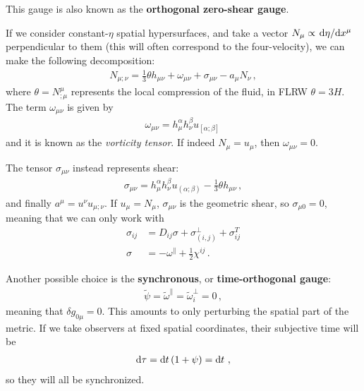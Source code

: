\documentclass[main.tex]{subfiles}
\begin{document}
This gauge is also known as the \textbf{orthogonal zero-shear gauge}.

If we consider constant-\(\eta \) spatial hypersurfaces, and take a vector \(N_\mu \propto \dv*{\eta }{x^{\mu }}\) perpendicular to them (this will often correspond to the four-velocity), we can make the following decomposition: 
%
\begin{align}
N_{\mu ; \nu } = \frac{1}{3} \theta h_{\mu \nu } + \omega_{\mu \nu } + \sigma_{\mu \nu } - a_\mu N_\nu 
\,,
\end{align}
%
where \(\theta = N^{\mu }_{;\mu }\) represents the local compression of the fluid, in FLRW \(\theta = 3 H\).
The term \(\omega_{\mu \nu }\) is given by 
%
\begin{align}
\omega_{\mu \nu } =  h^{\alpha }_{\mu } h^{\beta }_{\nu } u_{[\alpha ; \beta ]}
\,
\end{align}
%
and it is known as the \emph{vorticity tensor}. 
If indeed \(N_\mu = u_\mu \), then \(\omega_{\mu \nu } = 0\). 

The tensor \(\sigma_{\mu \nu }\) instead represents shear:
%
\begin{align}
\sigma_{\mu \nu } =   h^{\alpha }_{\mu } h^{\beta }_{\nu } u_{(\alpha ; \beta )} - \frac{1}{3} \theta h_{\mu \nu }
\,,
\end{align}
%
and finally \(a^{\mu } = u^{\nu } u_{\mu ; \nu }\).
If \(u_{\mu} = N_\mu\), \(\sigma_{\mu \nu } \) is the geometric shear, so \(\sigma_{\mu 0} = 0\), meaning that we can only work with 
%
\begin{align}
\sigma_{ij} &= D_{ij} \sigma + \sigma^{\perp}_{(i, j)} + \sigma^{T}_{ij}  \\
\sigma &= - \omega^{\parallel} + \frac{1}{2} \chi^{ij}
\,.
\end{align}


Another possible choice is the \textbf{synchronous}, or \textbf{time-orthogonal gauge}: 
%
\begin{align}
\widetilde{\psi} = \widetilde{\omega}^{\parallel} = \widetilde{\omega}^{\perp}_i = 0
\,,
\end{align}
%
meaning that \(\delta g_{0\mu } = 0 \). 
This amounts to only perturbing the spatial part of the metric.
If we take observers at fixed spatial coordinates, their subjective time will be 
%
\begin{align}
\dd{\tau } = \dd{t} \qty(1 + \psi ) = \dd{t}
\,,
\end{align}
%
so they will all be synchronized. 
\end{document}
